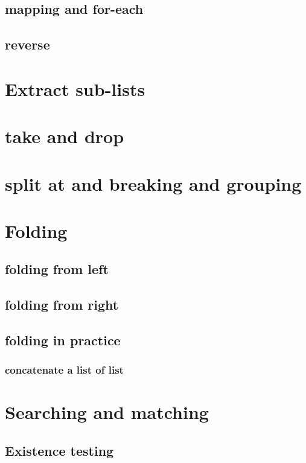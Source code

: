 \documentclass{article}
\begin{document}
\subsection{mapping and for-each}

\subsection{reverse}

\section{Extract sub-lists}

\section{take and drop}

\section{split at and breaking and grouping}

\section{Folding}

\subsection{folding from left}

\subsection{folding from right}

\subsection{folding in practice}

\subsubsection{concatenate a list of list}

\section{Searching and matching}

\subsection{Existence testing}
\end{document}
